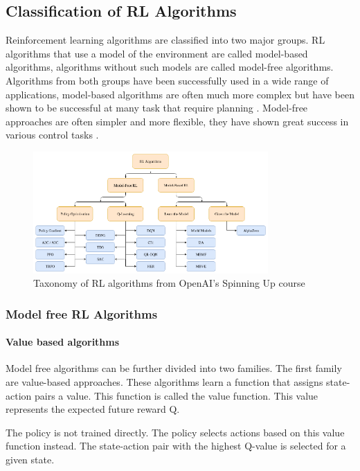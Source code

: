 \subsection{Classification of \acs{RL} Algorithms}

Reinforcement learning algorithms are classified into two major groups. RL algorithms that use a model of the environment are called model-based algorithms, algorithms without such models are called model-free algorithms. Algorithms from both groups have been successfully used in a wide range of applications, model-based algorithms are often much more complex but have been shown to be successful at many task that require planning \textcite{alphagoimprovementmuzero}. Model-free approaches are often simpler and more flexible, they have shown great success in various control tasks \textcite{atari}.

\begin{figure}
    \centering
    \includegraphics[width=0.8\textwidth]{Bilder/openai_spinningup_taxonomy.png}
    \caption{Taxonomy of RL algorithms from OpenAI's Spinning Up course \autocite{spinningup}}
\end{figure}

\subsubsection{Model free \acs{RL} Algorithms}

\paragraph{Value based algorithms}
Model free algorithms can be further divided into two families. The first family are value-based approaches. These algorithms learn a function that assigns state-action pairs a value. This function is called the value function. This value represents the expected future reward Q.
 
The policy is not trained directly. The policy selects actions based on this value function instead. The state-action pair with the highest Q-value is selected for a given state.

